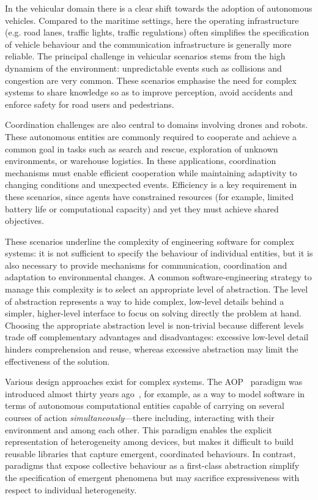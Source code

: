 \documentclass[12pt,a4paper,openright,twoside]{book}
\begin{document}
%
In the vehicular domain 
there is a clear shift towards the adoption of autonomous vehicles. 
%
Compared to the maritime settings, 
here the operating infrastructure 
(e.g. road lanes, traffic lights, traffic regulations) 
often simplifies the specification of vehicle behaviour 
and the communication infrastructure is generally more reliable. 
%
The principal challenge in vehicular scenarios stems from 
the high dynamism of the environment: 
unpredictable events such as collisions and congestion are very common. 
%
These scenarios emphasise the need for complex systems 
to share knowledge so as to improve perception, 
avoid accidents 
and enforce safety for road users and pedestrians.

%
Coordination challenges 
are also central to domains involving drones and robots. 
%
These autonomous entities are commonly required to cooperate 
and achieve a common goal in tasks such as 
search and rescue, 
exploration of unknown environments, 
or warehouse logistics. 
%
In these applications, 
coordination mechanisms must enable efficient cooperation 
while maintaining adaptivity to changing conditions and unexpected events. 
%
Efficiency is a key requirement in these scenarios, 
since agents have constrained resources 
(for example, limited battery life or computational capacity) 
and yet they must achieve shared objectives.

These scenarios underline the complexity of engineering software for complex systems: 
it is not sufficient to specify the behaviour of individual entities, 
but it is also necessary to provide mechanisms for 
communication, 
coordination 
and adaptation to environmental changes. 
%
A common software-engineering strategy to manage this complexity 
is to select an appropriate level of abstraction.
%
The level of abstraction represents a way to hide complex, 
low-level details behind a simpler, 
higher-level interface to focus on solving directly the problem at hand.
%
Choosing the appropriate abstraction level is non-trivial 
because different levels trade off complementary advantages and disadvantages: 
excessive low-level detail hinders comprehension and reuse, 
whereas excessive abstraction may limit the effectiveness of the solution.

Various design approaches exist for complex systems. 
%
The \ac{AOP}~\cite{DBLP:journals/ai/Shoham93} paradigm was introduced almost thirty years ago~\cite{DBLP:journals/ai/Shoham93},
for example, 
as a way to model software in terms of autonomous computational entities
capable of carrying on several courses of action \emph{simultaneously}---there including,
interacting with their environment and among each other.
%
This paradigm enables the explicit representation of heterogeneity among devices, 
but makes it difficult to build reusable libraries that capture emergent, 
coordinated behaviours. 
%
In contrast, 
paradigms that expose collective behaviour 
as a first-class abstraction simplify the specification 
of emergent phenomena 
but may sacrifice expressiveness with respect to individual heterogeneity.
\end{document}
